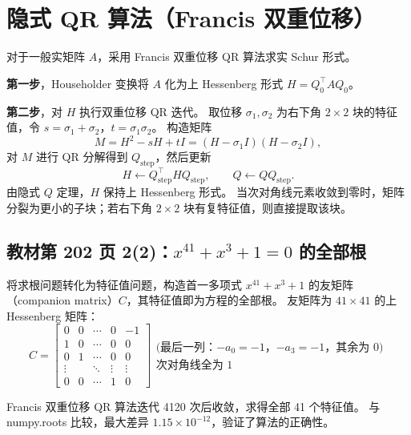 \documentclass[10pt, a4paper]{article}
\begin{document}
\section{隐式 QR 算法（Francis 双重位移）}

对于一般实矩阵 $A$，采用 Francis 双重位移 QR 算法求实 Schur 形式。

\textbf{第一步}，Householder 变换将 $A$ 化为上 Hessenberg 形式 $H = Q_0^{\!\top} A Q_0$。

\textbf{第二步}，对 $H$ 执行双重位移 QR 迭代。
取位移 $\sigma_1, \sigma_2$ 为右下角 $2\times2$ 块的特征值，令 $s = \sigma_1 + \sigma_2$，$t = \sigma_1\sigma_2$。
构造矩阵
\[
M = H^2 - sH + tI = (H - \sigma_1 I)(H - \sigma_2 I),
\]
对 $M$ 进行 QR 分解得到 $Q_{\text{step}}$，然后更新
\[
H \leftarrow Q_{\text{step}}^{\!\top} H Q_{\text{step}}, \qquad
Q \leftarrow Q Q_{\text{step}}.
\]
由隐式 $Q$ 定理，$H$ 保持上 Hessenberg 形式。
当次对角线元素收敛到零时，矩阵分裂为更小的子块；若右下角 $2\times2$ 块有复特征值，则直接提取该块。

\subsection{教材第 202 页 2(2)：$x^{41} + x^3 + 1 = 0$ 的全部根}

将求根问题转化为特征值问题，构造首一多项式 $x^{41} + x^3 + 1$ 的友矩阵（companion matrix）$C$，其特征值即为方程的全部根。
友矩阵为 $41\times41$ 的上 Hessenberg 矩阵：
\[
C = \begin{bmatrix}
0 & 0 & \cdots & 0 & -1 \\
1 & 0 & \cdots & 0 & 0 \\
0 & 1 & \cdots & 0 & 0 \\
\vdots & & \ddots & \vdots & \vdots \\
0 & 0 & \cdots & 1 & 0
\end{bmatrix}
\begin{array}{l}
\text{(最后一列：$-a_0=-1$，$-a_3=-1$，其余为 $0$)} \\
\text{次对角线全为 $1$}
\end{array}
\]

Francis 双重位移 QR 算法迭代 4120 次后收敛，求得全部 41 个特征值。
与 numpy.roots 比较，最大差异 $1.15\times10^{-12}$，验证了算法的正确性。
\end{document}
